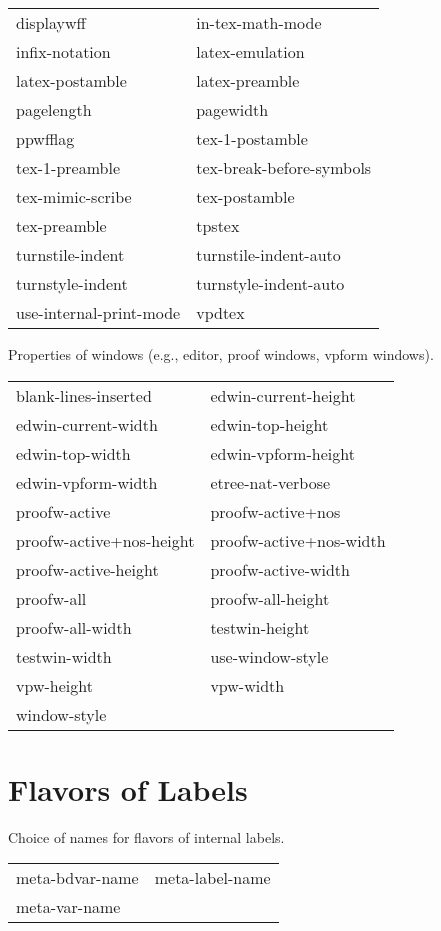 \begin{description}
\begin{tabular}{l l}
displaywff&in-tex-math-mode\\
infix-notation&latex-emulation\\
latex-postamble&latex-preamble\\
pagelength&pagewidth\\
ppwfflag&tex-1-postamble\\
tex-1-preamble&tex-break-before-symbols\\
tex-mimic-scribe&tex-postamble\\
tex-preamble&tpstex\\
turnstile-indent&turnstile-indent-auto\\
turnstyle-indent&turnstyle-indent-auto\\
use-internal-print-mode&vpdtex\\
\end{tabular}

\item[WINDOW-PROPS]  
Properties of windows (e.g., editor, proof windows, vpform windows).

\begin{tabular}{l l}
blank-lines-inserted&edwin-current-height\\
edwin-current-width&edwin-top-height\\
edwin-top-width&edwin-vpform-height\\
edwin-vpform-width&etree-nat-verbose\\
proofw-active&proofw-active+nos\\
proofw-active+nos-height&proofw-active+nos-width\\
proofw-active-height&proofw-active-width\\
proofw-all&proofw-all-height\\
proofw-all-width&testwin-height\\
testwin-width&use-window-style\\
vpw-height&vpw-width\\
window-style
\end{tabular}
\item
\end{description}

\section{Flavors of Labels}

\begin{description} 
\item[INTERNAL-NAMES]  
Choice of names for flavors of internal labels.

\begin{tabular}{l l}
meta-bdvar-name&meta-label-name\\
meta-var-name
\end{tabular}
\item
\end{description}

